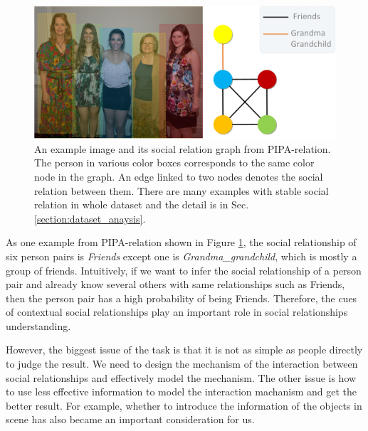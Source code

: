 \documentclass{article}
\begin{document}
\vspace*{-1mm}
\begin{figure}[htpb]
	\centering
	\includegraphics[width=0.48 \textwidth,clip]{./pic/example.png}
  \caption{An example image and its social relation graph from PIPA-relation. The person in various color boxes corresponds to the same color node in the graph. An edge linked to two nodes denotes the social relation between them. There are many examples with stable social relation in whole dataset and the detail is in Sec. \ref{section:dataset_anaysis}.}
	\vspace*{-3.5mm}
	\label{fig:example}
\end{figure}

As one example from PIPA-relation \cite{DBLP:conf/cvpr/SunSF17} shown in Figure \ref{fig:example}, the social relationship of six person pairs is {\it Friends} except one is {\it Grandma\_grandchild}, which is mostly a group of friends. Intuitively, if we want to infer the social relationship of a person pair and already know several others with same relationships such as Friends, then the person pair has a high probability of being Friends. Therefore, the cues of contextual social relationships play an important role in social relationships understanding.

However, the biggest issue of the task is that it is not as simple as people directly to judge the result. We need to design the mechanism of the interaction between social relationships and effectively model the mechanism. The other issue is how to use less effective information to model the interaction machanism and get the better result. For example, whether to introduce the information of the objects in scene has also became an important consideration for us.
\end{document}
